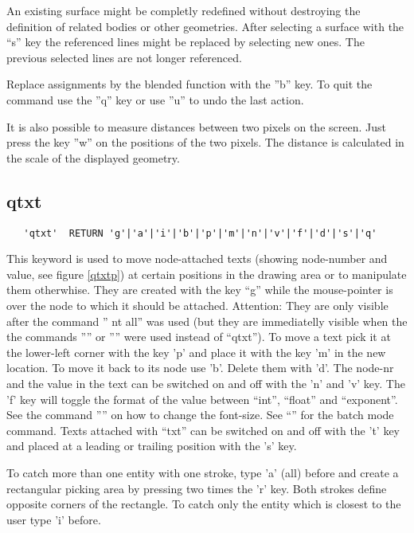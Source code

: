 \documentclass{article}
\begin{document}
An existing surface might be completly redefined without destroying the definition of related bodies or other geometries. After selecting a surface with the ``s'' key the referenced lines might be replaced by selecting new ones. The previous selected lines are not longer referenced.

Replace assignments by the blended function with the ''b'' key. To quit the command use the ''q'' key or use ''u'' to undo the last action. 

It is also possible to measure distances between two pixels on the screen. Just press the key ''w'' on the positions of the two pixels. The distance is calculated in the scale of the displayed geometry. 

\subsection{\label{qtxt}qtxt}
\begin{verbatim}
   'qtxt'  RETURN 'g'|'a'|'i'|'b'|'p'|'m'|'n'|'v'|'f'|'d'|'s'|'q' 
\end{verbatim}
This keyword is used to move node-attached texts (showing node-number and value, see figure \ref{qtxtp}) at certain positions in the drawing area or to manipulate them otherwhise. They are created with the key ``g'' while the mouse-pointer is over the node to which it should be attached. Attention: They are only visible after the command '' nt all'' was used (but they are immediatelly visible when the the commands '''' or '''' were used instead of ``qtxt''). To move a text pick it at the lower-left corner with the key 'p' and place it with the key 'm' in the new location. To move it back to its node use 'b'. Delete them with 'd'. The node-nr and the value in the text can be switched on and off with the 'n' and 'v' key. The 'f' key will toggle the format of the value between ``int'', ``float'' and ``exponent''. See the command '''' on how to change the font-size. See ``'' for the batch mode command. Texts attached with ``txt'' can be switched on and off with the 't' key and placed at a leading or trailing position with the 's' key.

To catch more than one entity with one stroke, type 'a' (all) before and create a rectangular picking area by pressing two times the 'r' key. Both strokes define opposite corners of the rectangle. To catch only the entity which is closest to the user type 'i' before.
  
\end{document}
